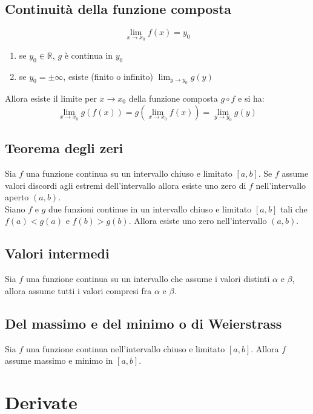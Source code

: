 \documentclass[12pt, a4paper]{report}
\begin{document}
    \section{Continuità della funzione composta}
    \begin{equation*}
        \lim_{x\to x_{0}}f(x)=y_{0}
    \end{equation*}
    \begin{enumerate}
        \item se $y_{0}\in \mathbb{R}$, $g$ è continua in $y_{0}$
        \item se $y_{0}=\pm\infty$, esiste (finito o infinito) $\lim_{y\to y_{0}}g(y)$
    \end{enumerate}
    Allora esiste il limite per $x\to x_{0}$ della funzione composta $g\circ f$ e si ha:
    \begin{equation*}
        \lim_{x\to x_{0}}g(f(x))=g(\lim_{x\to x_{0}}f(x))=\lim_{y\to y_{0}}g(y)
    \end{equation*}
    \section{Teorema degli zeri}
    Sia $f$ una funzione continua su un intervallo chiuso e limitato $[a,b]$. Se $f$ assume valori discordi agli estremi dell'intervallo allora esiste uno zero di $f$ nell'intervallo aperto $(a,b)$.\\
    Siano $f$ e $g$ due funzioni continue in un intervallo chiuso e limitato $[a,b]$ tali che $f(a)<g(a)$ e $f(b)>g(b)$. Allora esiste uno zero nell'intervallo $(a,b)$.
    \section{Valori intermedi}
    Sia $f$ una funzione continua su un intervallo che assume i valori distinti $\alpha$ e $\beta$, allora assume tutti i  valori compresi fra $\alpha$ e $\beta$.
    \section{Del massimo e del minimo o di Weierstrass}
    Sia $f$ una funzione continua nell'intervallo chiuso e limitato $[a,b]$. Allora $f$ assume massimo e minimo in $[a,b]$.
    \chapter{Derivate}
\end{document}
